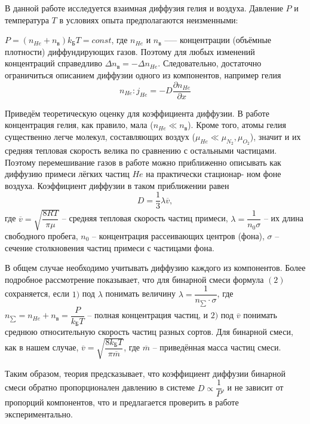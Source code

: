 В данной работе исследуется взаимная диффузия гелия и воздуха. Давление $P$ и температура $T$ в условиях опыта предполагаются неизменными: 

$P = (n_{He} + n_{\text{в}}) k_{\text{Б}} T = const$, где $n_{He}$ и $n_{\text{в}}$ --— концентрации (объёмные плотности) диффундирующих газов. Поэтому для любых изменений концентраций справедливо $\Delta n_{\text{в}} = - \Delta n_{He}$. Следовательно, достаточно ограничиться описанием диффузии одного из компонентов, например гелия 
\begin{equation}
	n_{He}:j_{He} = -D \dfrac{\partial n_{He}}{\partial x}
\end{equation}

Приведём теоретическую оценку для коэффициента диффузии. В работе концентрация гелия, как правило, мала ($n_{He} \ll n_{\text{в}}$). Кроме того, атомы гелия существенно легче молекул, составляющих воздух ($\mu_{He} \ll \mu_{N_2}, \mu_{O_2}$), значит и их средняя тепловая скорость велика по сравнению с остальными частицами. Поэтому перемешивание газов в работе можно приближенно описывать как диффузию примеси лёгких частиц $He$ на практически стационар-
ном фоне воздуха. Коэффициент диффузии в таком приближении равен 
\begin{equation}
	D = \dfrac{1}{3} \lambda \overline{v},
\end{equation}
где $\overline{v} = \sqrt{\dfrac{8RT}{\pi \mu}}$ -- средняя тепловая скорость частиц примеси,
$\lambda = \dfrac{1}{n_0 \sigma}$ -- их длина свободного пробега, $n_0$ -- концентрация рассеивающих центров (фона), $\sigma$ -- сечение столкновения частиц примеси с частицами фона.

В общем случае необходимо учитывать диффузию каждого из компонентов. Более подробное рассмотрение показывает, что для бинарной смеси формула $(2)$ сохраняется, если $1)$ под $\lambda$ понимать величину $\lambda = \dfrac{1}{n_{\sum} \cdot \sigma}$, где $n_{\sum} = n_{He} + n_{\text{в}} = \dfrac{P}{k_{\text{Б}} T}$ -- полная концентрация частиц, и $2)$ под $\overline{v}$ понимать среднюю относительную скорость частиц разных сортов. Для бинарной смеси, как в нашем случае, $\overline{v} = \sqrt{\dfrac{8 k_{\text{Б}} T}{\pi \overline{m}}}$, где $\overline{m}$ -- приведённая масса частиц смеси.

Таким образом, теория предсказывает, что коэффициент диффузии бинарной смеси обратно пропорционален давлению в системе $D \propto \dfrac{1}{P}$, и не зависит от пропорций компонентов, что и предлагается проверить в работе экспериментально.

